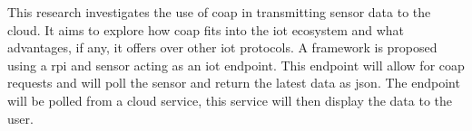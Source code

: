This research investigates the use of \gls{coap} in transmitting sensor data
to the cloud. It aims to explore how \gls{coap} fits into the \gls{iot} ecosystem and
what advantages, if any, it offers over other \gls{iot} protocols. A framework is proposed 
using a \gls{rpi} and sensor acting as an \gls{iot} endpoint. This endpoint will allow for
\gls{coap} requests and will poll the sensor and return the latest data as \gls{json}.
The endpoint will be polled from a cloud service, this service will then display the data to 
the user.
